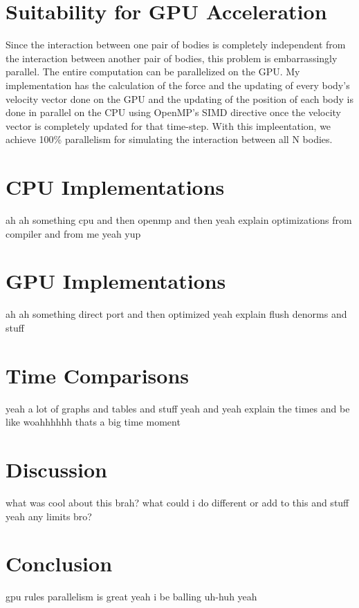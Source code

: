 \section{Suitability for GPU Acceleration}
Since the interaction between one pair of bodies is completely independent from the 
interaction between another pair of bodies, this problem is embarrassingly parallel. 
The entire computation can be parallelized on the GPU. 
My implementation has the calculation of the force and the updating of every body's velocity vector 
done on the GPU and the updating of the position of each 
body is done in parallel on the CPU using OpenMP's SIMD directive once the velocity vector is completely
updated for that time-step. With this impleentation, we achieve 100\% parallelism for simulating
the interaction between all N bodies.

\section{CPU Implementations}
ah ah something cpu and then openmp and then yeah
explain optimizations from compiler and from me yeah yup

\section{GPU Implementations}
ah ah something direct port and then optimized yeah
explain flush denorms and stuff 

\section{Time Comparisons}
yeah a lot of graphs and tables and stuff yeah and yeah
explain the times and be like woahhhhhh thats a big time moment

\section{Discussion}
what was cool about this brah?
what could i do different or add to this and stuff yeah
any limits bro?

\section{Conclusion}
gpu rules parallelism is great yeah i be balling uh-huh yeah

